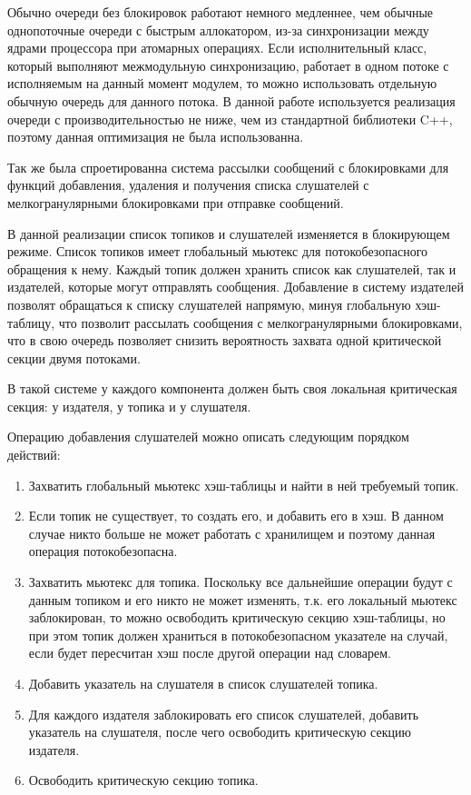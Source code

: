 Обычно очереди без блокировок работают немного медленнее, чем обычные однопоточные очереди с быстрым аллокатором, из-за синхронизации между ядрами процессора при атомарных операциях. Если исполнительный класс, который выполняют межмодульную синхронизацию, работает в одном потоке с исполняемым на данный момент модулем, то можно использовать отдельную обычную очередь для данного потока. В данной работе используется реализация очереди с производительностью не ниже, чем из стандартной библиотеки C++, поэтому данная оптимизация не была использованна.

Так же была спроетированна система рассылки сообщений с блокировками для функций добавления, удаления и получения списка слушателей с мелкогранулярными блокировками при отправке сообщений.

В данной реализации список топиков и слушателей изменяется в блокирующем режиме. Список топиков имеет глобальный мьютекс для потокобезопасного обращения к нему. Каждый топик должен хранить список как слушателей, так и издателей, которые могут отправлять сообщения. Добавление в систему издателей позволят обращаться к списку слушателей напрямую, минуя глобальную хэш-таблицу, что позволит рассылать сообщения с мелкогранулярными блокировками, что в свою очередь позволяет снизить вероятность захвата одной критической секции двумя потоками.

В такой системе у каждого компонента должен быть своя локальная критическая секция: у издателя, у топика и у слушателя.

Операцию добавления слушателей можно описать следующим порядком действий:

\begin{enumerate}
	\item Захватить глобальный мьютекс хэш-таблицы и найти в ней требуемый топик.
	\item Если топик не существует, то создать его, и добавить его в хэш. В данном случае никто больше не может работать с хранилищем и поэтому данная операция потокобезопасна.
	\item Захватить мьютекс для топика. Поскольку все дальнейшие операции будут с данным топиком и его никто не может изменять, т.к. его локальный мьютекс заблокирован, то можно освободить критическую секцию хэш-таблицы, но при этом топик должен храниться в потокобезопасном указателе на случай, если будет пересчитан хэш после другой операции над словарем.
	\item Добавить указатель на слушателя в список слушателей топика.
	\item Для каждого издателя заблокировать его список слушателей, добавить указатель на слушателя, после чего освободить критическую секцию издателя.
	\item Освободить критическую секцию топика.
\end{enumerate}

